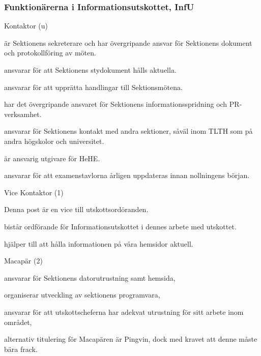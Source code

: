 \documentclass[10pt]{article}
\begin{document}
\subsubsection{Funktionärerna i Informationsutskottet, InfU}
\begin{emptylist}
    \item Kontaktor (u)
        \begin{dashlist}
            \item är Sektionens sekreterare och har övergripande ansvar för Sektionens dokument och protokollföring av möten.
            \item ansvarar för att Sektionens stydokument hålls aktuella.
            \item ansvarar för att upprätta handlingar till Sektionsmötena.
            \item har det övergripande ansvaret för Sektionens informationsspridning och PR-verksamhet.
            \item ansvarar för Sektionens kontakt med andra sektioner, såväl inom TLTH som på andra högskolor och universitet.
            \item är ansvarig utgivare för HeHE.
            \item ansvarar för att examenstavlorna årligen uppdateras innan nollningens början.
        \end{dashlist}
    \item Vice Kontaktor (1)
        \begin{dashlist}
            \item Denna post är en vice till utskottsordöranden.
            \item bistår ordförande för Informationsutskottet i dennes arbete med utskottet.
            \item hjälper till att hålla informationen på våra hemsidor aktuell.
        \end{dashlist}
    \item Macapär (2)
        \begin{dashlist}
            \item ansvarar för Sektionens datorutrustning samt hemsida,
            \item organiserar utveckling av sektionens programvara,
            \item ansvarar för att utskottscheferna har adekvat utrustning
                för sitt arbete inom området,
            \item alternativ titulering för Macapären är Pingvin, dock
                med kravet att denne måste bära frack.

\end{dashlist}
\end{emptylist}
\end{document}
